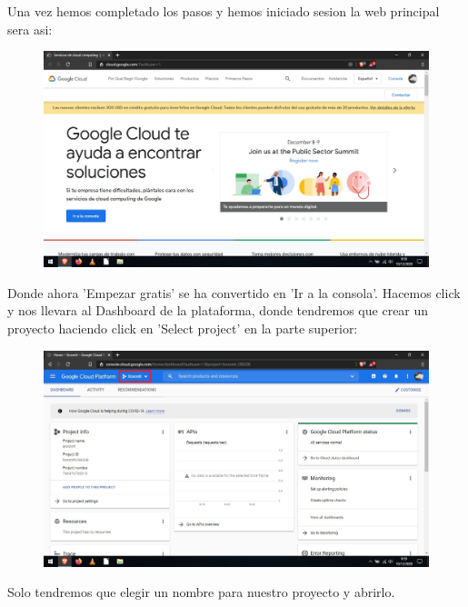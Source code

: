 \documentclass[a4paper,10pt]{article}
\begin{document}
Una vez hemos completado los pasos y hemos iniciado sesion la web principal sera asi:

\begin{figure}[H]
\begin{center}
\includegraphics[width=500pt]{./fotos/GoogleCloud/5 - GC.jpg}
\end{center}
\end{figure}

Donde ahora 'Empezar gratis' se ha convertido en 'Ir a la consola'. Hacemos click y nos llevara al Dashboard de la plataforma, donde tendremos que crear un proyecto haciendo click en 'Select project' en la parte superior:

\begin{figure}[H]
\begin{center}
\includegraphics[width=500pt]{./fotos/GoogleCloud/6 - GC (V).jpg}
\end{center}
\end{figure}

Solo tendremos que elegir un nombre para nuestro proyecto y abrirlo.
\end{document}
